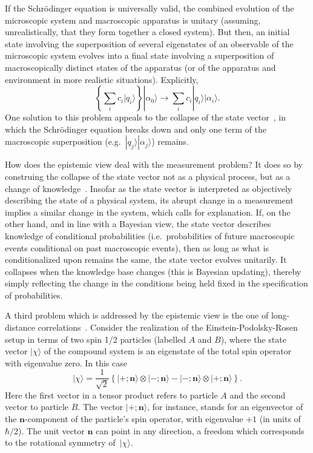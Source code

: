 \documentclass[12pt]{article}
\begin{document}
If the Schr\"{o}dinger equation is universally
valid, the combined evolution of the microscopic
system and macroscopic apparatus is unitary (assuming,
unrealistically, that they form together a closed system).
But then, an initial state involving the superposition
of several eigenstates of an observable of the microscopic system
evolves into a final state involving a superposition of
macroscopically distinct states of the apparatus
(or of the apparatus and environment in more
realistic situations).  Explicitly,
%
\begin{equation}
\left\{ \sum_i c_i |q_i \rangle \right\}
|\alpha_0 \rangle \rightarrow
\sum_i c_i |q_i \rangle |\alpha_i \rangle .
\end{equation}
%
One solution to this problem appeals to the collapse
of the state vector~\cite{neumann}, in which the
Schr\"{o}dinger equation breaks down and only one term
of the macroscopic superposition (e.g.\
$|q_j \rangle |\alpha_j \rangle$) remains.

How does the epistemic view deal with the
measurement problem?  It does so by construing
the collapse of the state vector not as a
physical process, but as a change of
knowledge~\cite{peierls}.  Insofar as the state
vector is interpreted as objectively describing
the state of a physical system, its abrupt change
in a measurement
implies a similar change in the system, which
calls for explanation.  If, on the other hand,
and in line with a Bayesian view,
the state vector describes knowledge of
conditional probabilities (i.e.\ probabilities of
future macroscopic events conditional on past
macroscopic events), then as long as what is 
conditionalized upon remains the same, the state
vector evolves unitarily.  It collapses when the
knowledge base changes (this is Bayesian updating),
thereby simply reflecting
the change in the conditions being held fixed
in the specification of probabilities.

A third problem which is addressed by the epistemic view
is the one of long-distance correlations~\cite{fuchs2,bloch}.
Consider the realization of the Einstein-Podolsky-Rosen
setup in terms of two spin 1/2 particles (labelled $A$
and $B$), where the state vector $|\chi\rangle$
of the compound system is an eigenstate of the
total spin operator with eigenvalue zero.  In this case
%
\begin{equation}
|\chi\rangle = \frac{1}{\sqrt{2}}
\left\{ |+; \mathbf{n} \rangle \otimes |-; \mathbf{n} \rangle -
|-; \mathbf{n} \rangle \otimes |+; \mathbf{n} \rangle \right\} .
\end{equation}
%
Here the first vector in a tensor product refers to
particle $A$ and the second vector to particle $B$.
The vector $|+; \mathbf{n} \rangle $, for instance,
stands for an eigenvector of the $\mathbf{n}$-component
of the particle's spin operator, with eigenvalue
$+1$ (in units of $\hbar/2$).
The unit vector $\mathbf{n}$ can point in any direction,
a freedom which corresponds to the
rotational symmetry of~$|\chi\rangle$.
\end{document}
